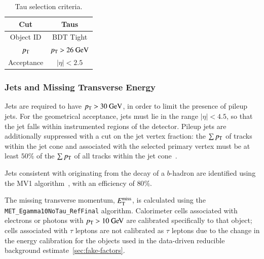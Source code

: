 \begin{table}[h]
	\tiny
	\centering
		\begin{tabular}{cc}
			Cut & Taus \\
			\hline
			Object ID & BDT Tight \\
			$p_{\text{T}}$ & $p_{\text{T}}>26~\mbox{GeV}$ \\
			Acceptance & $|\eta|<2.5$ \\
		\end{tabular}
	\caption{Tau selection criteria.}
	\label{table:tau-selections}
\end{table}

\subsubsection{Jets and Missing Transverse Energy}\label{sec:model-independent-jets-met}


Jets are required to have $p_{\text{T}}>30~\mbox{GeV}$, in order to limit the presence of pileup jets. For the geometrical acceptance, jets must lie in the range $|\eta|<4.5$, so that the jet falls within instrumented regions of the detector. Pileup jets are additionally suppressed with a cut on the jet vertex fraction: the $\sum p_{\text{T}}$ of tracks within the jet cone and associated with the selected primary vertex must be at least $50\%$ of the $\sum p_{\text{T}}$ of all tracks within the jet cone~\cite{jvf}. 

Jets consistent with originating from the decay of a $b$-hadron are identified using the MV1 algorithm~\cite{MV1}, with an efficiency of $80\%$. 

The missing transverse momentum, $E_{\text{T}}^{\text{miss}}$, is calculated using the \texttt{ MET\_Egamma10NoTau\_RefFinal} algorithm. Calorimeter cells associated with electrons or photons with $\pt>10 \GeV$ are calibrated specifically to that object; cells associated with $\tau$ leptons are not calibrated as $\tau$ leptons due to the change in the energy calibration for the objects used in the data-driven reducible background estimate~\ref{sec:fake-factors}. 



